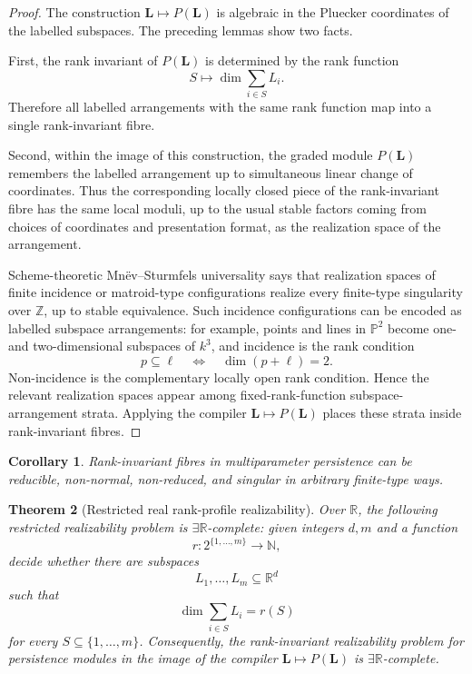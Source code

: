 \documentclass[11pt]{article}
\newtheorem{theorem}{Theorem}[section]
\newtheorem{corollary}[theorem]{Corollary}
\begin{document}
\begin{proof}
The construction \(\mathbf L\mapsto P(\mathbf L)\) is algebraic in the Pluecker coordinates of the labelled subspaces. The preceding lemmas show two facts.

First, the rank invariant of \(P(\mathbf L)\) is determined by the rank function
\[
S\mapsto \dim\sum_{i\in S}L_i.
\]
Therefore all labelled arrangements with the same rank function map into a single rank-invariant fibre.

Second, within the image of this construction, the graded module \(P(\mathbf L)\) remembers the labelled arrangement up to simultaneous linear change of coordinates. Thus the corresponding locally closed piece of the rank-invariant fibre has the same local moduli, up to the usual stable factors coming from choices of coordinates and presentation format, as the realization space of the arrangement.

Scheme-theoretic Mnëv--Sturmfels universality says that realization spaces of finite incidence or matroid-type configurations realize every finite-type singularity over \(\mathbb Z\), up to stable equivalence. Such incidence configurations can be encoded as labelled subspace arrangements: for example, points and lines in \(\mathbb P^2\) become one- and two-dimensional subspaces of \(k^3\), and incidence is the rank condition
\[
p\subseteq \ell
\quad\Longleftrightarrow\quad
\dim(p+\ell)=2.
\]
Non-incidence is the complementary locally open rank condition. Hence the relevant realization spaces appear among fixed-rank-function subspace-arrangement strata. Applying the compiler \(\mathbf L\mapsto P(\mathbf L)\) places these strata inside rank-invariant fibres.
\end{proof}

\begin{corollary}
Rank-invariant fibres in multiparameter persistence can be reducible, non-normal, non-reduced, and singular in arbitrary finite-type ways.
\end{corollary}

\begin{theorem}[Restricted real rank-profile realizability]
Over \(\mathbb R\), the following restricted realizability problem is \(\exists\mathbb R\)-complete: given integers \(d,m\) and a function
\[
r:2^{\{1,\ldots,m\}}\to\mathbb N,
\]
decide whether there are subspaces
\[
L_1,\ldots,L_m\subseteq\mathbb R^d
\]
such that
\[
\dim\sum_{i\in S}L_i=r(S)
\]
for every \(S\subseteq\{1,\ldots,m\}\). Consequently, the rank-invariant realizability problem for persistence modules in the image of the compiler \(\mathbf L\mapsto P(\mathbf L)\) is \(\exists\mathbb R\)-complete.
\end{theorem}
\end{document}
